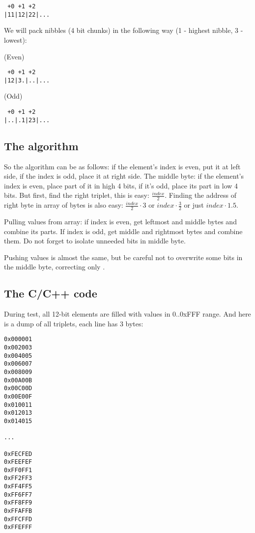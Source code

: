 \begin{lstlisting}
 +0 +1 +2
|11|12|22|...
\end{lstlisting}

We will pack nibbles (4 bit chunks) in the following way (1 - highest nibble, 3 - lowest):

(Even)

\begin{lstlisting}
 +0 +1 +2
|12|3.|..|...
\end{lstlisting}

(Odd)

\begin{lstlisting}
 +0 +1 +2
|..|.1|23|...
\end{lstlisting}

\subsection{The algorithm}

So the algorithm can be as follows: if the element's index is even, put it at left side, if the index is odd, place it at right side.
The middle byte: if the element's index is even, place part of it in high 4 bits, if it's odd, place its part in low 4 bits.
But first, find the right triplet, this is easy: $\frac{index}{2}$.
Finding the address of right byte in array of bytes is also easy: $\frac{index}{2} \cdot 3$ or $index \cdot \frac{3}{2}$ or just $index \cdot 1.5$.

Pulling values from array: if index is even, get leftmost and middle bytes and combine its parts.
If index is odd, get middle and rightmost bytes and combine them.
Do not forget to isolate unneeded bits in middle byte.

Pushing values is almost the same, but be careful not to overwrite some  bits in the middle byte, correcting only .

\subsection{The C/C++ code}



During test, all 12-bit elements are filled with values in 0..0xFFF range.
And here is a dump of all triplets, each line has 3 bytes:

\begin{lstlisting}
0x000001
0x002003
0x004005
0x006007
0x008009
0x00A00B
0x00C00D
0x00E00F
0x010011
0x012013
0x014015

...

0xFECFED
0xFEEFEF
0xFF0FF1
0xFF2FF3
0xFF4FF5
0xFF6FF7
0xFF8FF9
0xFFAFFB
0xFFCFFD
0xFFEFFF
\end{lstlisting}

